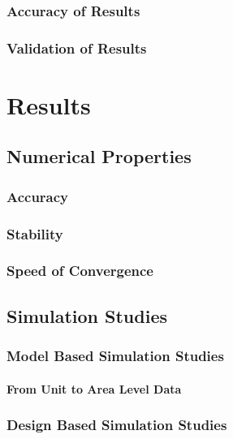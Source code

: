 \section{Accuracy of Results}
\section{Validation of Results}



\part{Results}\label{part:results}

\chapter{Numerical Properties}
\section{Accuracy}
\section{Stability}
\section{Speed of Convergence}

\chapter{Simulation Studies}
\section{Model Based Simulation Studies}


\subsection{From Unit to Area Level Data}


\section{Design Based Simulation Studies}



